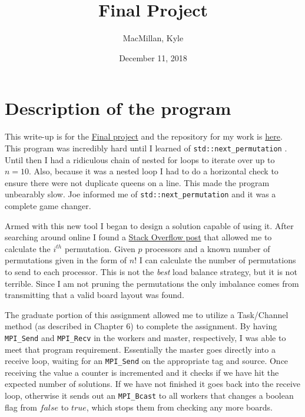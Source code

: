 \documentclass{article}
\title{\textbf{Final Project}}
\author{MacMillan, Kyle}
\date{December 11, 2018}
\begin{document}
\maketitle
{}

\newpage
{}   %
\tableofcontents
{}

\newpage
\listoffigures
{}

\newpage
{}  %
\hypersetup{
    colorlinks,
    citecolor=blue,
    filecolor=black,
    linkcolor=blue,
    urlcolor=blue
}

\section{Description of the program}
\setcounter{page}{1} %
This write-up is for the 
\href{https://www.mcs.sdsmt.edu/ckarlsso/csc410/fall18/csc410_Final.pdf}{Final project} 
and the repository for my work is \href{https://github.com/macattackftw/HighPerfComputing/tree/master/final}{here}.
\\
This program was incredibly hard until I learned of \verb|std::next_permutation|
. Until then I had a ridiculous chain of nested for loops to iterate over up to 
$n = 10$. Also, because it was a nested loop I had to do a horizontal check to 
ensure there were not duplicate queens on a line. This made the program 
unbearably slow. Joe informed me of \verb|std::next_permutation| and it was a 
complete game changer. 

Armed with this new tool I began to design a solution capable of using it. After 
searching around online I found a 
\href{https://stackoverflow.com/a/7919887}{Stack Overflow post} that allowed me 
to calculate the $i^{th}$ permutation. Given $p$ processors and a known number 
of permutations given in the form of $n!$ I can calculate the number of 
permutations to send to each processor. This is not the \textit{best} load 
balance strategy, but it is not terrible. Since I am not pruning the 
permutations the only imbalance comes from transmitting that a valid board 
layout was found.

The graduate portion of this assignment allowed me to utilize a Task/Channel 
method (as described in Chapter 6) to complete the assignment. By having 
\verb|MPI_Send| and \verb|MPI_Recv| in the workers and master, respectively, I 
was able to meet that program requirement. Essentially the master goes directly 
into a receive loop, waiting for an \verb|MPI_Send| on the appropriate tag and 
source. Once receiving the value a counter is incremented and it checks if we 
have hit the expected number of solutions. If we have not finished it goes back 
into the receive loop, otherwise it sends out an \verb|MPI_Bcast| to all workers 
that changes a boolean flag from $false$ to $true$, which stops them from 
checking any more boards.
\end{document}
